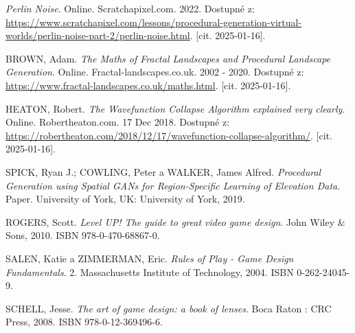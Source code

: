 \begin{thebibliography}{99}
    \textit{Perlin Noise}. Online. Scratchapixel.com. 2022. Dostupné z: \url{https://www.scratchapixel.com/lessons/procedural-generation-virtual-worlds/perlin-noise-part-2/perlin-noise.html}. [cit. 2025-01-16].


    BROWN, Adam. \textit{The Maths of Fractal Landscapes and Procedural Landscape Generation}. Online. Fractal-landscapes.co.uk. 2002 - 2020. Dostupné z: \url{https://www.fractal-landscapes.co.uk/maths.html}. [cit. 2025-01-16].

    HEATON, Robert. \textit{The Wavefunction Collapse Algorithm explained very clearly}. Online. Robertheaton.com. 17 Dec 2018. Dostupné z: \url{https://robertheaton.com/2018/12/17/wavefunction-collapse-algorithm/}. [cit. 2025-01-16].

    SPICK, Ryan J.; COWLING, Peter a WALKER, James Alfred. \textit{Procedural Generation using Spatial GANs for Region-Specific Learning of Elevation Data}. Paper. University of York, UK: University of York, 2019.

    ROGERS, Scott. \textit{Level UP! The guide to great video game design}. John Wiley \& Sons, 2010. ISBN 978-0-470-68867-0.
    
    SALEN, Katie a ZIMMERMAN, Eric. \textit{Rules of Play - Game Design Fundamentals}. 2. Massachusetts Institute of Technology, 2004. ISBN 0-262-24045-9.
    
    SCHELL, Jesse. \textit{The art of game design: a book of lenses}. Boca Raton : CRC Press, 2008. ISBN 978-0-12-369496-6.


    
\end{thebibliography}